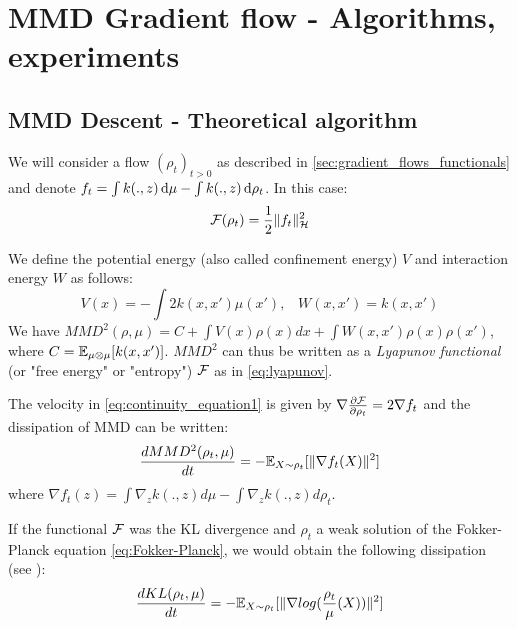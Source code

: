 \section{MMD Gradient flow - Algorithms, experiments}\label{sec:mmd_flow}

\subsection{MMD Descent - Theoretical algorithm}

We will consider a flow $(\rho_t)_{t>0}$ as described in \cref{sec:gradient_flows_functionals} and denote $f_t= \int k(.,z)\mathop{}\!\mathrm{d} \mu - \int k(.,z)\mathop{}\!\mathrm{d} \rho_t$. In this case:
\begin{equation}
{{\mathcal F}}(\rho_t)=\frac{1}{2}\|f_t\|^2_{{{\mathcal H}}}
\end{equation} 

We define the potential energy (also called confinement energy) $V$ and interaction energy $W$ as follows:
\begin{equation}
V(x)=-\int 2 k(x,x')\mu(x')\text{,} \quad
W(x,x')=k(x,x')
\end{equation}
We have $MMD^2(\rho,\mu)=C+ \int V(x) \rho(x)dx + \int W(x,x')\rho(x)\rho(x')$, where $C={{\mathbb E}}_{\mu\otimes \mu}[k(x,x')]$. $MMD^2$ can thus be written as a \textit{Lyapunov functional} (or "free energy" or "entropy") ${{\mathcal F}}$ as in \eqref{eq:lyapunov}.



\begin{proposition}\label{prop:mmd_flow}
 The velocity in \eqref{eq:continuity_equation1} is given by $\nabla \frac{\partial{{{\mathcal F}}}}{\partial{\rho_t}}=2 \nabla f_t$ and the dissipation of MMD can be written:  
	\begin{equation}
	\frac{d MMD^2(\rho_t, \mu)}{dt}=-{{\mathbb E}}_{X \sim \rho_t}[\|\nabla f_t(X)\|^2]
	\end{equation}
	where $\nabla f_t(z)= \int \nabla_{z}k(.,z) d\mu -  \int \nabla_{z}k(.,z) d\rho_t$.
\end{proposition}

\begin{remark}
	If the functional ${{\mathcal F}}$ was the KL divergence and $\rho_t$ a weak solution of the Fokker-Planck equation \eqref{eq:Fokker-Planck}, we would obtain the following dissipation (see \cite{wibisono2018sampling}):
	\begin{equation}
	\frac{d KL(\rho_t, \mu)}{dt}=-{{\mathbb E}}_{X \sim \rho_t}[\|\nabla log(\frac{\rho_t}{\mu}(X))\|^2]
	\end{equation}
\end{remark}


